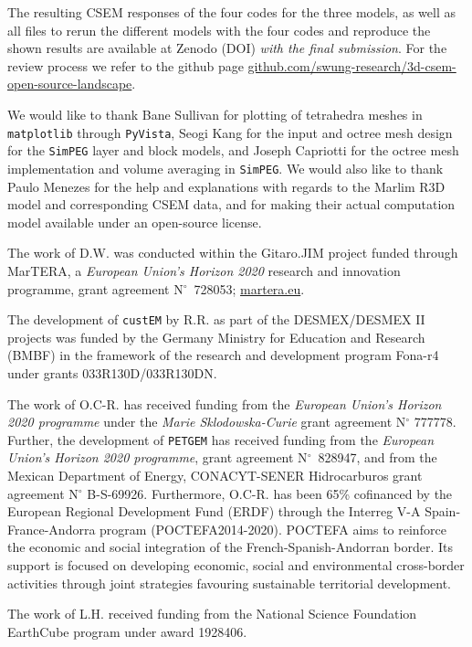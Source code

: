 \documentclass[onecolumn,extra,camera]{gji}
\newcommand{\simpeg}{\texttt{SimPEG}\xspace}
\newcommand{\custem}{\texttt{custEM}\xspace}
\newcommand{\petgem}{\texttt{PETGEM}\xspace}
\begin{document}
The resulting CSEM responses of the four codes for the three models, as well as all files to rerun the different models with the four codes and reproduce the shown results are available at Zenodo (DOI) \emph{with the final submission}. For the review process we refer to the github page \href{https://github.com/swung-research/3d-csem-open-source-landscape}{github.com/swung-research/3d-csem-open-source-landscape}.


\begin{acknowledgments}

We would like to thank Bane Sullivan for plotting of tetrahedra meshes in \texttt{matplotlib} through \texttt{PyVista}, Seogi Kang for the input and octree mesh design for the \simpeg layer and block models, and Joseph Capriotti for the octree mesh implementation and volume averaging in \simpeg. We would also like to thank Paulo Menezes for the help and explanations with regards to the Marlim R3D model and corresponding CSEM data, and for making their actual computation model available under an open-source license.

The work of D.W. was conducted within the Gitaro.JIM project funded through MarTERA, a \emph{European Union's Horizon 2020} research and innovation programme, grant agreement N$^\circ$~728053; \href{https://www.martera.eu}{martera.eu}.

The development of \custem by R.R. as part of the DESMEX/DESMEX II projects was funded by the Germany Ministry for Education and Research (BMBF) in the framework of the research and development program Fona-r4 under grants 033R130D/033R130DN.

The work of O.C-R. has received funding from the \emph{European Union's Horizon 2020 programme} under the \emph{Marie Sklodowska-Curie} grant agreement N$^\circ$ 777778. Further, the development of \petgem has received funding from the \emph{European Union's Horizon 2020 programme}, grant agreement N$^\circ$~828947, and from the Mexican Department of Energy, CONACYT-SENER Hidrocarburos grant agreement N$^\circ$ B-S-69926. Furthermore, O.C-R. has been 65\% cofinanced by the European Regional Development Fund (ERDF) through the Interreg V-A Spain-France-Andorra program (POCTEFA2014-2020). POCTEFA aims to reinforce the economic and social integration of the French-Spanish-Andorran border. Its support is focused on developing economic, social and environmental cross-border activities through joint strategies favouring sustainable territorial development.

The work of L.H. received funding from the National Science Foundation EarthCube program under award 1928406.
\end{acknowledgments}




\label{lastpage}
\end{document}
